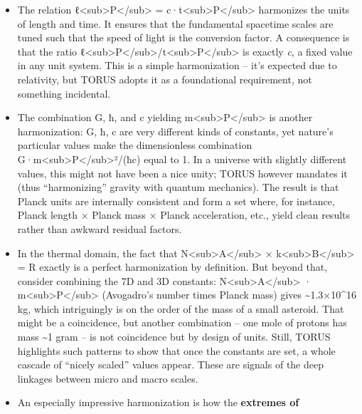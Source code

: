 \documentclass[
]{article}
\begin{document}
\begin{itemize}
\item
  The relation ℓ\textless sub\textgreater P\textless/sub\textgreater{} =
  c·t\textless sub\textgreater P\textless/sub\textgreater{} harmonizes
  the units of length and time. It ensures that the fundamental
  spacetime scales are tuned such that the speed of light is the
  conversion factor. A consequence is that the ratio
  ℓ\textless sub\textgreater P\textless/sub\textgreater/t\textless sub\textgreater P\textless/sub\textgreater{}
  is exactly \emph{c}, a fixed value in any unit system. This is a
  simple harmonization -- it's expected due to relativity, but TORUS
  adopts it as a foundational requirement, not something incidental.
\item
  The combination G, ħ, and c yielding
  m\textless sub\textgreater P\textless/sub\textgreater{} is another
  harmonization: G, ħ, c are very different kinds of constants, yet
  nature's particular values make the dimensionless combination
  G·m\textless sub\textgreater P\textless/sub\textgreater²/(ħc) equal to
  1\hspace{0pt}. In a universe with slightly different values, this
  might not have been a nice unity; TORUS however mandates it (thus
  ``harmonizing'' gravity with quantum mechanics). The result is that
  Planck units are internally consistent and form a set where, for
  instance, Planck length × Planck mass × Planck acceleration, etc.,
  yield clean results rather than awkward residual factors.
\item
  In the thermal domain, the fact that
  N\textless sub\textgreater A\textless/sub\textgreater{} ×
  k\textless sub\textgreater B\textless/sub\textgreater{} = R exactly is
  a perfect harmonization by definition. But beyond that, consider
  combining the 7D and 3D constants:
  N\textless sub\textgreater A\textless/sub\textgreater{} ·
  m\textless sub\textgreater P\textless/sub\textgreater{} (Avogadro's
  number times Planck mass) gives \textasciitilde1.3×10\^{}16
  kg\hspace{0pt}, which intriguingly is on the order of the mass of a
  small asteroid. That might be a coincidence, but another combination
  -- one mole of protons has mass \textasciitilde1 gram -- is not
  coincidence but by design of units. Still, TORUS highlights such
  patterns to show that once the constants are set, a whole cascade of
  ``nicely scaled'' values appear. These are signals of the deep
  linkages between micro and macro scales.
\item
  An especially impressive harmonization is how the \textbf{extremes of
}
\end{itemize}
\end{document}
